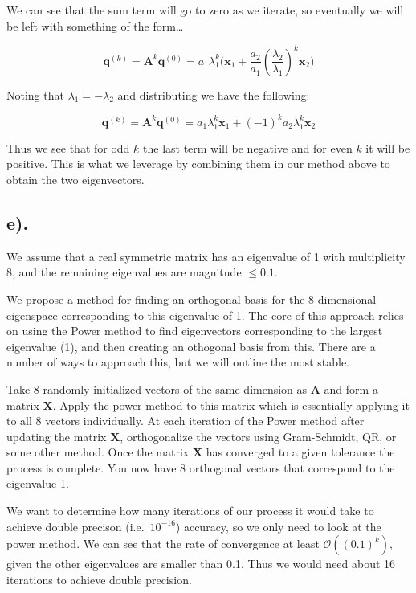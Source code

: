 \documentclass[11pt]{article}
\begin{document}
    We can see that the sum term will go to zero as we iterate, so
eventually we will be left with something of the form\ldots{}

\[ \mathbf{q}^{(k)} = \mathbf{A}^k\mathbf{q}^{(0)} = a_1\lambda_1^k\big(\mathbf{x}_1+\frac{a_2}{a_1}(\frac{\lambda_2}{\lambda_1})^k\mathbf{x}_2\big) \]

Noting that \(\lambda_1=-\lambda_2\) and distributing we have the
following:

\[ \mathbf{q}^{(k)} = \mathbf{A}^k\mathbf{q}^{(0)} = a_1\lambda_1^k\mathbf{x}_1 + (-1)^ka_2\lambda_1^k\mathbf{x}_2\]

    Thus we see that for odd \(k\) the last term will be negative and for
even \(k\) it will be positive. This is what we leverage by combining
them in our method above to obtain the two eigenvectors.

    \hypertarget{e.}{%
\subsection*{e).}\label{e.}}

We assume that a real symmetric matrix has an eigenvalue of 1 with
multiplicity 8, and the remaining eigenvalues are magnitude \(\leq0.1\).

    We propose a method for finding an orthogonal basis for the 8
dimensional eigenspace corresponding to this eigenvalue of 1. The core
of this approach relies on using the Power method to find eigenvectors
corresponding to the largest eigenvalue (1), and then creating an
othogonal basis from this. There are a number of ways to approach this,
but we will outline the most stable.

Take 8 randomly initialized vectors of the same dimension as
\(\mathbf{A}\) and form a matrix \(\mathbf{X}\). Apply the power method
to this matrix which is essentially applying it to all 8 vectors
individually. At each iteration of the Power method after updating the
matrix \(\mathbf{X}\), orthogonalize the vectors using Gram-Schmidt, QR,
or some other method. Once the matrix \(\mathbf{X}\) has converged to a
given tolerance the process is complete. You now have 8 orthogonal
vectors that correspond to the eigenvalue 1.

    We want to determine how many iterations of our process it would take to
achieve double precison (i.e.~\(10^{-16}\)) accuracy, so we only need to
look at the power method. We can see that the rate of convergence at
least \(\mathcal{O}((0.1)^k)\), given the other eigenvalues are smaller
than 0.1. Thus we would need about 16 iterations to achieve double
precision.


    
    
    
\end{document}
